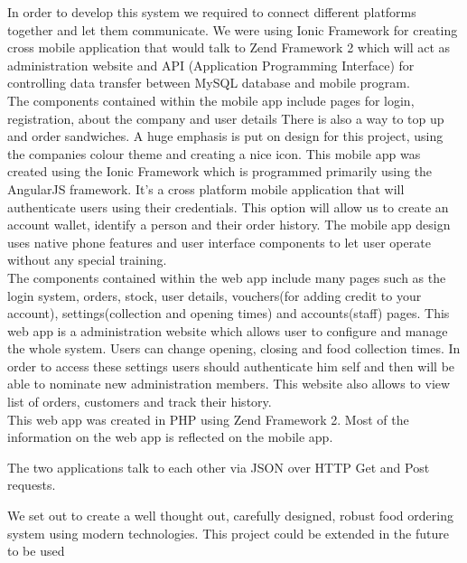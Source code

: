In order to develop this system we required to connect different platforms together and let them communicate. We were using Ionic Framework for creating cross mobile application that would talk to Zend Framework 2 which will act as administration website and API (Application Programming Interface) for controlling data transfer between MySQL database and mobile program.
\\

The components contained within the mobile app include pages for login, registration, about the company and user details There is also a way to top up and order sandwiches.
A huge emphasis is put on design for this project, using the companies colour theme and creating a nice icon.
This mobile app was created using the Ionic Framework which is programmed primarily using the AngularJS framework.
It's a cross platform mobile application that will authenticate users using their credentials. This option will allow us to create an account wallet, identify a person and their order history. The mobile app design uses native phone features and user interface components to let user operate without any special training.
\\

The components contained within the web app include many pages such as the login system, orders, stock, user details, vouchers(for adding credit to your account), settings(collection and opening times) and accounts(staff) pages.
This web app is a administration website which allows user to configure and manage the whole system. Users can change opening, closing and food collection times. In order to access these settings users should authenticate him self and then will be able to nominate new administration members. This website also allows to view list of orders, customers and track their history.  
\\

This web app was created in PHP using Zend Framework 2.
Most of the information on the web app is reflected on the mobile app.

The two applications talk to each other via JSON over HTTP Get and Post requests. 

We set out to create a well thought out, carefully designed, robust food ordering system using modern technologies.
This project could be extended in the future to be used 
\\

